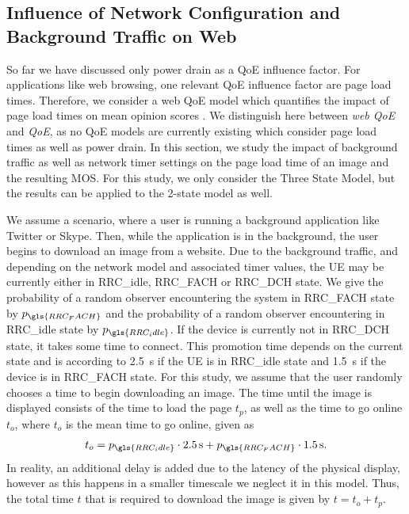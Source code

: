 \subsection{Influence of Network Configuration and Background Traffic on Web }\label{sec:network:network_traces:numerical_results:web_qoe}
So far we have discussed only power drain as a \gls{QoE} influence factor.
For applications like web browsing, one relevant QoE influence factor are page load times.
Therefore, we consider a web QoE model which quantifies the impact of page load times on mean opinion scores \cite{egger2012a}.
We distinguish here between \emph{web \gls{QoE}} and \emph{\gls{QoE}}, as no \gls{QoE} models are currently existing which consider page load times as well as power drain.
In this section, we study the impact of background traffic as well as network timer settings on the page load time of an image and the resulting \gls{MOS}.
For this study, we only consider the Three State Model, but the results can be applied to the 2-state model as well.

We assume a scenario, where a user is running a background application like Twitter or Skype.
Then, while the application is in the background, the user begins to download an image from a website.
Due to the background traffic, and depending on the network model and associated timer values, the \gls{UE} may be currently either in \gls{RRC_idle}, \gls{RRC_FACH} or \gls{RRC_DCH} state.
We give the probability of a random observer encountering the system in \gls{RRC_FACH} state by \(p_{\gls{RRC_FACH}}\) and the probability of a random observer encountering in \gls{RRC_idle} state by $p_{\gls{RRC_idle}}$.
If the device is currently not in \gls{RRC_DCH} state, it takes some time to connect.
This promotion time depends on the current state and is according to \cite{Qian2010b} \SI{2.5}{\second} if the \gls{UE} is in \gls{RRC_idle} state and \SI{1.5}{\second} if the device is in \gls{RRC_FACH} state.
For this study, we assume that the user randomly chooses a time to begin downloading an image.
The time until the image is displayed consists of the time to load the page \(t_p\), as well as the time to go online \(t_o\), where \(t_o\) is the mean time to go online, given as
\[t_o = p_{\gls{RRC_idle}} \cdot \SI{2.5}{\second} + p_{\gls{RRC_FACH}} \cdot \SI{1.5}{\second}.\]
In reality, an additional delay is added due to the latency of the physical display, however as this happens in a smaller timescale we neglect it in this model.
Thus, the total time \(t\) that is required to download the image is given by \(t = t_o + t_p\).

